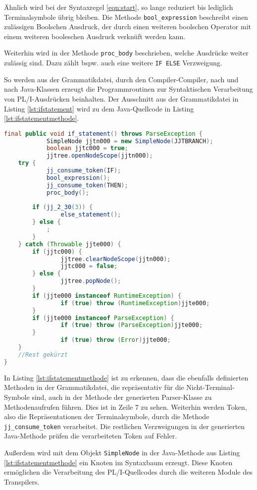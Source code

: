 Ähnlich wird bei der Syntaxregel \ref{eqn:start}, so lange reduziert bis lediglich Terminalsymbole übrig bleiben.
Die Methode \verb+bool_expression+ beschreibt einen zulässigen Boolschen Ausdruck, der durch einen weiteren boolschen Operator mit einem weiteren booleschen Ausdruck verknüft werden kann.

Weiterhin wird in der Methode \verb+proc_body+ beschrieben, welche Ausdrücke weiter zulässig sind. Dazu zählt bspw. auch eine weitere \verb+IF ELSE+ Verzweigung. 

 So werden aus der Grammatikdatei, durch den Compiler-Compiler, nach und nach Java-Klassen erzeugt die Programmroutinen zur Syntaktischen Verarbeitung von PL/I-Ausdrücken beinhalten.
Der Ausschnitt aus der Grammatikdatei in Listing \ref{lst:ifstatement} wird zu dem Java-Quellcode in Listing \ref{lst:ifstatementmethode}.


\begin{lstlisting}[language=Java, caption=Verkürzte If-Statement Methode aus dem Parser, label={lst:ifstatementmethode}]
 final public void if_statement() throws ParseException {
			SimpleNode jjtn000 = new SimpleNode(JJTBRANCH);
			boolean jjtc000 = true;
			jjtree.openNodeScope(jjtn000);
	try {
			jj_consume_token(IF);
			bool_expression();
			jj_consume_token(THEN);
			proc_body();
		
		if (jj_2_30(3)) {
				else_statement();
		} else {
			;
		}
	} catch (Throwable jjte000) {
		if (jjtc000) {
				jjtree.clearNodeScope(jjtn000);
				jjtc000 = false;
		} else {
				jjtree.popNode();
		}
		if (jjte000 instanceof RuntimeException) {
				if (true) throw (RuntimeException)jjte000;
		}
		if (jjte000 instanceof ParseException) {
				if (true) throw (ParseException)jjte000;
		}
				if (true) throw (Error)jjte000;
	}
	//Rest gekürzt
}	
\end{lstlisting}

In Listing \ref{lst:ifstatementmethode} ist zu erkennen, dass die ebenfalls definierten Methoden in der Grammatikdatei, die repräsentativ für die Nicht-Terminal-Symbole sind, auch in der Methode der generierten Parser-Klasse zu Methodenaufrufen führen. Dies ist in Zeile 7 zu sehen. Weiterhin werden Token, also die Repräsentationen der Terminalsymbole, durch die Methode \verb+jj_consume_token+ verarbeitet. Die restlichen Verzweigungen in der generierten Java-Methode prüfen die verarbeiteten Token auf Fehler.

Außerdem wird mit dem Objekt \verb+SimpleNode+ in der Java-Methode aus Listing \ref{lst:ifstatementmethode} ein Knoten im Syntaxbaum erzeugt. Diese Knoten ermöglichen die Verarbeitung des PL/I-Quellcodes durch die weiteren Module des Transpilers.

